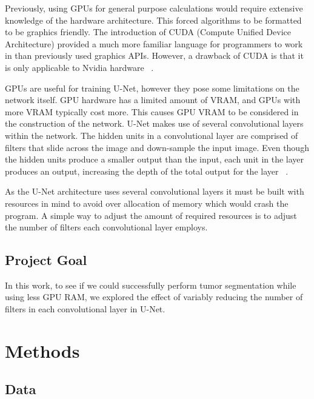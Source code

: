 \documentclass[conference]{IEEEtran}
\begin{document}
Previously, using GPUs for general purpose calculations would require extensive knowledge of the hardware architecture. This forced algorithms to be formatted to be graphics friendly. The introduction of CUDA (Compute Unified Device Architecture) provided a much more familiar language for programmers to work in than previously used graphics APIs. However, a drawback of CUDA is that it is only applicable to Nvidia hardware ~\cite{strigl2010performance}.

GPUs are useful for training U-Net, however they pose some limitations on the network itself. GPU hardware has a limited amount of VRAM, and GPUs with more VRAM typically cost more. This causes GPU VRAM to be considered in the construction of the network. U-Net makes use of several convolutional layers within the network. The hidden units in a convolutional layer are comprised of filters that slide across the image and down-sample the input image. Even though the hidden units produce a smaller output than the input, each unit in the layer produces an output, increasing the depth of the total output for the layer ~\cite{michelucci2019advanced}. 

 As the U-Net architecture uses several convolutional layers it must be built with resources in mind to avoid over allocation of memory which would crash the program. A simple way to adjust the amount of required resources is to adjust the number of filters each convolutional layer employs.


\subsection{Project Goal}
In this work, to see if we could successfully perform tumor segmentation while using less GPU RAM, we explored the effect of variably reducing the number of filters in each convolutional layer in U-Net. 


\section{Methods}

\subsection{Data}
\end{document}
